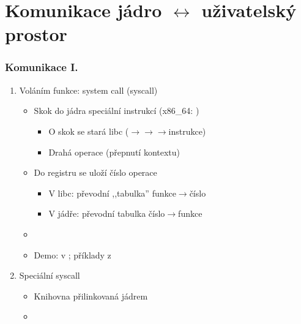 
\section{Komunikace jádro $\leftrightarrow$ uživatelský prostor}
\frame{\sectionpage}

\begin{frame}
  \frametitle{Komunikace I.}
  \begin{enumerate}
    \item Voláním funkce: system call (syscall)

    \pause

    \begin{itemize}
      \item Skok do jádra speciální instrukcí (x86\_64: )
      \begin{itemize}
	\item O skok se stará libc ($\rightarrow$$\rightarrow$$\rightarrow$instrukce)
	\item Drahá operace (přepnutí kontextu)
      \end{itemize}

      \pause

      \item Do registru se uloží číslo operace
      \begin{itemize}
	\item V libc: převodní ,,tabulka'' funkce$\rightarrow$číslo
	\item V jádře: převodní tabulka číslo$\rightarrow$funkce
      \end{itemize}

      \pause

      \item {}
      \item Demo:  v ; příklady z 
    \end{itemize}

    \pause

    \item Speciální syscall
    \begin{itemize}
      \item Knihovna přilinkovaná jádrem
      \item {}
    \end{itemize}
  \end{enumerate}

  \pause
  \medskip

  \begin{center}
  \end{center}

\end{frame}

